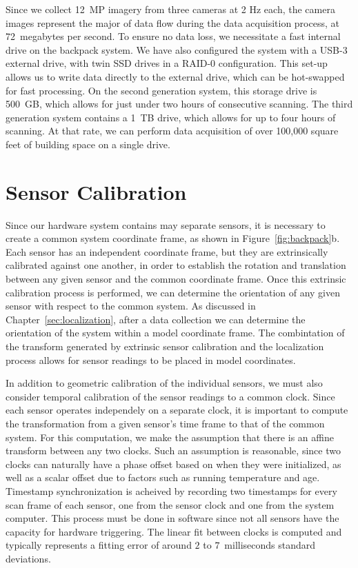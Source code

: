 \documentclass[12pt,onecolumn,oneside]{book}
\begin{document}
Since we collect 12~MP imagery from three cameras at 2 Hz each, the camera images represent the major of data flow during the data acquisition process, at 72~megabytes per second.  To ensure no data loss, we necessitate a fast internal drive on the backpack system.  We have also configured the system with a USB-3 external drive, with twin SSD drives in a RAID-0 configuration.  This set-up allows us to write data directly to the external drive, which can be hot-swapped for fast processing.  On the second generation system, this storage drive is 500~GB, which allows for just under two hours of consecutive scanning.  The third generation system contains a 1~TB drive, which allows for up to four hours of scanning.  At that rate, we can perform data acquisition of over 100,000 square feet of building space on a single drive.

\section{Sensor Calibration}
\label{sec:calibration}

Since our hardware system contains may separate sensors, it is necessary to create a common system coordinate frame, as shown in Figure~\ref{fig:backpack}b.  Each sensor has an independent coordinate frame, but they are extrinsically calibrated against one another, in order to establish the rotation and translation between any given sensor and the common coordinate frame.  Once this extrinsic calibration process is performed, we can determine the orientation of any given sensor with respect to the common system.  As discussed in Chapter~\ref{sec:localization}, after a data collection we can determine the orientation of the system within a model coordinate frame.  The combintation of the transform generated by extrinsic sensor calibration and the localization process allows for sensor readings to be placed in model coordinates.

In addition to geometric calibration of the individual sensors, we must also consider temporal calibration of the sensor readings to a common clock.  Since each sensor operates independely on a separate clock, it is important to compute the transformation from a given sensor's time frame to that of the common system.  For this computation, we make the assumption that there is an affine transform between any two clocks.  Such an assumption is reasonable, since two clocks can naturally have a phase offset based on when they were initialized, as well as a scalar offset due to factors such as running temperature and age.  Timestamp synchronization is acheived by recording two timestamps for every scan frame of each sensor, one from the sensor clock and one from the system computer.  This process must be done in software since not all sensors have the capacity for hardware triggering.  The linear fit between clocks is computed and typically represents a fitting error of around $2$ to $7$~milliseconds standard deviations.
\end{document}

